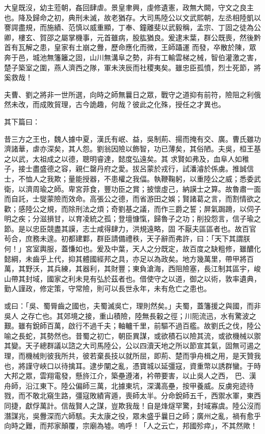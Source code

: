 \begin{pinyinscope}
 大皇既沒，幼主蒞朝，姦回肆虐。景皇聿興，虔修遺憲，政無大闕，守文之良主也。降及歸命之初，典刑未滅，故老猶存。大司馬陸公以文武熙朝，左丞相陸凱以謇諤盡規，而施績、范慎以威重顯，丁奉、鐘離斐以武毅稱，孟宗、丁固之徒為公卿，樓玄、賀邵之屬掌機事，元首雖病，股肱猶良。爰逮末葉，群公既喪，然後黔首有瓦解之患，皇家有土崩之釁，歷命應化而微，王師躡運
 而發，卒散於陳，眾奔于邑，城池無籓籬之固，山川無溝阜之勢，非有工輸雲梯之械，智伯灌激之害，楚子築室之圍，燕人濟西之隊，軍未浹辰而社稷夷矣。雖忠臣孤憤，烈士死節，將奚救哉！



 夫曹、劉之將非一世所選，向時之師無曩日之眾，戰守之道抑有前符，險阻之利俄然未改，而成敗貿理，古今詭趣，何哉？彼此之化殊，授任之才異也。



 其下篇曰：



 昔三方之王也，魏人據中夏，漢氏有岷、益，吳制荊、揚而掩有交、廣。曹氏雖功濟諸華，虐亦深矣，其人怨。劉翁因險以飾智，功已薄矣，其俗陋。夫吳，桓王基之以武，太祖成之以德，聰明睿達，懿度弘遠矣。其
 求賢如弗及，血阜人如稚子，接士盡盛德之容，親仁罄丹府之愛。拔呂蒙於戎行，試潘濬於係虜。推誠信士，不恤人之我欺；量能授器，不患權之我偪。執鞭鞠躬，以重陸公之威；悉委武衛，以濟周瑜之師。卑宮菲食，豐功臣之賞；披懷虛己，納謨士之算。故魯肅一面而自託，士燮蒙險而效命。高張公之德，而省游田之娛；賢諸葛之言，而割情欲之歡；感陸公之規，而除刑法之煩；奇劉基之議，而作三爵之誓；屏氣跼蹐，以伺子明之疾；分滋損甘，以育凌統之孤；登壇慷愾，歸魯子之功；削投怨言，信子瑜之節。是以忠臣競盡其謨，志士咸得肆力，洪規遠略，固
 不厭夫區區者也。故百官茍合，庶務未遑。初都建鄴，群臣請備禮秩，天子辭而弗許，曰：「天下其謂朕何！」宮室輿服，蓋慊如也。爰及中葉，天人之分既定，故百度之缺粗修，雖醲化懿綱，未齒乎上代，抑其體國經邦之具，亦足以為政矣。地方幾萬里，帶甲將百萬，其野沃，其兵練，其器利，其財豐；東負滄海，西阻險塞，長江制其區宇，峻山帶其封域，國家之利未見有弘於茲者也。借使守之以道，御之以術，敦率遺典，勤人謹政，修定策，守常險，則可以長世永年，未有危亡之患也。



 或曰：「吳、蜀脣齒之國也，夫蜀滅吳亡，理則然矣。」夫蜀，蓋籓援之與國，而非吳人
 之存亡也。其郊境之接，重山積險，陸無長轂之徑；川阨流迅，水有驚波之艱。雖有銳師百萬，啟行不過千夫；軸轤千里，前驅不過百艦。故劉氏之伐，陸公喻之長蛇，其勢然也。昔蜀之初亡，朝臣異謀，或欲積石以險其流，或欲機械以禦其變。天子總群議以諮之大司馬陸公，公以四瀆天地之所以節宣其氣，固無可遏之理，而機械則彼我所共，彼若棄長技以就所屈，即荊、楚而爭舟楫之用，是天贊我也，將謹守峽口以待擒耳。逮步闡之亂，憑寶城以延彊寇，資重幣以誘群蠻。于時大邦之眾，雲翔電發，懸旍江介，築壘遵渚，衿帶要害，以止吳人之西，
 巴、漢舟師，沿江東下。陸公偏師三萬，北據東坑，深溝高壘，按甲養威。反虜宛迹待戮，而不敢北窺生路，彊寇敗績宵遁，喪師太半。分命銳師五千，西禦水軍，東西同捷，獻俘萬計。信哉賢人之謀，豈欺我哉！自是烽燧罕驚，封域寡虞。陸公沒而潛謀兆，吳釁深而六師駭。夫太康之役，眾未盛乎曩日之師；廣州之亂，禍有愈乎向時之難，而邦家顛覆，宗廟為墟。嗚呼！「人之云亡，邦國殄瘁」，不其然歟！




\end{pinyinscope}

